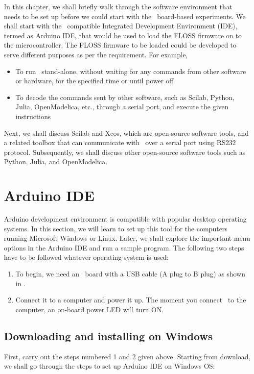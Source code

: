 In this chapter, we shall briefly walk through the software
environment that needs to be set up before we could start with the
\arduino\ board-based experiments. We shall start with the \arduino\
compatible Integrated Development Environment (IDE), termed as Arduino
IDE, that would be used to load the FLOSS firmware on to the
microcontroller. The FLOSS firmware to be loaded could be developed to serve
different purposes as per the requirement. For example, 
\begin{itemize}
      \item To run \arduino\ stand-alone, without waiting for any commands
            from other software or hardware, for the specified time or until
            power off
      \item To decode the commands sent by other software, such as Scilab, Python, 
            Julia, OpenModelica, etc., through a serial port, and 
            execute the given instructions %
\end{itemize}
Next, we shall discuss Scilab and Xcos, which are open-source software
tools, and a related toolbox that can communicate with \arduino\ 
over a serial port using RS232 protocol. Subsequently, we shall discuss 
other open-source software tools such as Python, Julia, and OpenModelica. 

\section{Arduino IDE}\label{arduino-ide}
\label{sec:ard-start}
Arduino development environment is compatible with popular desktop
operating systems. In this section, we will learn to set up this tool
for the computers running Microsoft Windows or Linux. Later, we shall
explore the important menu options in the Arduino IDE and run a sample
program.  The following two steps have to be followed whatever operating
system is used:

\begin{enumerate}
      \item To begin, we need an \arduino\ board with a USB cable (A plug to
            B plug) as shown in .
      \item Connect it to a computer and power it up. The moment you connect \arduino\
            to the computer, an on-board power LED will turn ON.
\end{enumerate}

\subsection{Downloading and installing on Windows}
First, carry out the steps numbered 1 and 2 given above.
Starting from download, we shall go through the steps to set up
Arduino IDE on Windows OS:

